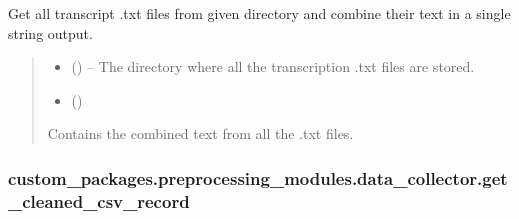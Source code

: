 \documentclass[letterpaper,10pt,english]{sphinxhowto}
\begin{document}
\begin{fulllineitems}
\label{\detokenize{_autosummary/custom_packages.preprocessing_modules.data_collector.get_transcripts:custom_packages.preprocessing_modules.data_collector.get_transcripts}}
\pysigstartsignatures
\pysiglinewithargsret
{}
{\sphinxparamcomma {}}
{}
\pysigstopsignatures
\sphinxAtStartPar
Get all transcript .txt files from given directory and combine their text
in a single string output.
\begin{quote}\begin{description}
\begin{itemize}
\item {} 
\sphinxAtStartPar
{} () – The directory where all the transcription .txt files are stored.

\item {} 
\sphinxAtStartPar
{} ()

\end{itemize}

\sphinxAtStartPar
Contains the combined text from all the .txt files.

\sphinxAtStartPar
{}

\end{description}\end{quote}

\end{fulllineitems}


\sphinxstepscope


\subsubsection{custom\_packages.preprocessing\_modules.data\_collector.get\_cleaned\_csv\_record}
\label{\detokenize{_autosummary/custom_packages.preprocessing_modules.data_collector.get_cleaned_csv_record:custom-packages-preprocessing-modules-data-collector-get-cleaned-csv-record}}\label{\detokenize{_autosummary/custom_packages.preprocessing_modules.data_collector.get_cleaned_csv_record::doc}}
\end{document}
